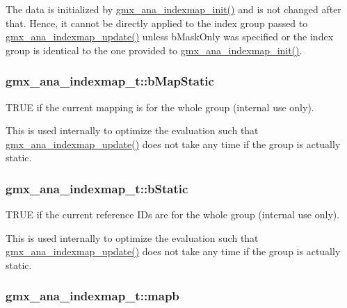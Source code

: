 \-The data is initialized by \hyperlink{include_2indexutil_8h_a3230fa2b1cf35d0f9c654b6e34265c00}{gmx\-\_\-ana\-\_\-indexmap\-\_\-init()} and is not changed after that. \-Hence, it cannot be directly applied to the index group passed to \hyperlink{include_2indexutil_8h_aeca832c56e9b3f19a049d65aff18cd69}{gmx\-\_\-ana\-\_\-indexmap\-\_\-update()} unless {\ttfamily b\-Mask\-Only} was specified or the index group is identical to the one provided to \hyperlink{include_2indexutil_8h_a3230fa2b1cf35d0f9c654b6e34265c00}{gmx\-\_\-ana\-\_\-indexmap\-\_\-init()}. \hypertarget{structgmx__ana__indexmap__t_a3923b2b17056e49ee7d60fc95b3d6775}{
\subsubsection[{b\-Map\-Static}]{ {\bf gmx\-\_\-ana\-\_\-indexmap\-\_\-t\-::b\-Map\-Static}}}\label{structgmx__ana__indexmap__t_a3923b2b17056e49ee7d60fc95b3d6775}


\-T\-R\-U\-E if the current mapping is for the whole group (internal use only). 

\-This is used internally to optimize the evaluation such that \hyperlink{include_2indexutil_8h_aeca832c56e9b3f19a049d65aff18cd69}{gmx\-\_\-ana\-\_\-indexmap\-\_\-update()} does not take any time if the group is actually static. \hypertarget{structgmx__ana__indexmap__t_a52010e6efe7e14189c9571d92b87172c}{
\subsubsection[{b\-Static}]{ {\bf gmx\-\_\-ana\-\_\-indexmap\-\_\-t\-::b\-Static}}}\label{structgmx__ana__indexmap__t_a52010e6efe7e14189c9571d92b87172c}


\-T\-R\-U\-E if the current reference \-I\-Ds are for the whole group (internal use only). 

\-This is used internally to optimize the evaluation such that \hyperlink{include_2indexutil_8h_aeca832c56e9b3f19a049d65aff18cd69}{gmx\-\_\-ana\-\_\-indexmap\-\_\-update()} does not take any time if the group is actually static. \hypertarget{structgmx__ana__indexmap__t_a1f237809f38e3e554d512b5fcd753107}{
\subsubsection[{mapb}]{ {\bf gmx\-\_\-ana\-\_\-indexmap\-\_\-t\-::mapb}}}\label{structgmx__ana__indexmap__t_a1f237809f38e3e554d512b5fcd753107}



